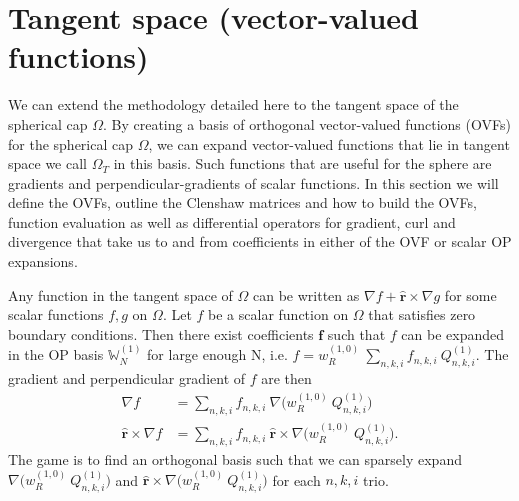 \documentclass[11pt, oneside]{article}   	%
\newcommand{\genjac}{R}
\newcommand{\genjacw}{w_\genjac}
\newcommand{\bigW}{\mathbb{W}}
\newcommand{\scop}{Q}
\newcommand{\scopnki}{\scop_{n,k,i}}
\newcommand{\tangentspace}{{\Omega_T}}
\newcommand{\rvec}{\hat{\bm{r}}}
\begin{document}


%
\section{Tangent space (vector-valued functions)}\label{Section:tangentspace}

We can extend the methodology detailed here to the tangent space of the spherical cap $\Omega$. By creating a basis of orthogonal vector-valued functions (OVFs) for the spherical cap $\Omega$, we can expand vector-valued functions that lie in tangent space we call $\tangentspace$ in this basis. Such functions that are useful for the sphere are gradients and perpendicular-gradients of scalar functions. In this section we will define the OVFs, outline the Clenshaw matrices and how to build the OVFs, function evaluation as well as differential operators for gradient, curl and divergence that take us to and from coefficients in either of the OVF or scalar OP expansions.

Any function in the tangent space of $\Omega$ can be written as $\nabla f + \rvec \times \nabla g$ for some scalar functions $f, g$ on $\Omega$. Let $f$ be a scalar function on $\Omega$ that satisfies zero boundary conditions. Then there exist coefficients $\bm{f}$ such that $f$ can be expanded in the OP basis $\bigW_N^{(1)}$ for large enough N, i.e. $f = \genjacw^{(1,0)} \: \sum_{n,k,i} f_{n,k,i} \: \scopnki^{(1)}$. The gradient and perpendicular gradient of $f$ are then
\begin{align*}
	\nabla f &= \sum_{n,k,i} f_{n,k,i} \: \nabla \Big( \genjacw^{(1,0)} \: \scopnki^{(1)} \Big) \\
	\rvec \times \nabla f &= \sum_{n,k,i} f_{n,k,i} \: \rvec \times \nabla \Big( \genjacw^{(1,0)} \: \scopnki^{(1)} \Big).
\end{align*}
The game is to find an orthogonal basis such that we can sparsely expand $\nabla \Big( \genjacw^{(1,0)} \: \scopnki^{(1)} \Big)$ and $\rvec \times \nabla \Big( \genjacw^{(1,0)} \: \scopnki^{(1)} \Big)$ for each $n,k,i$ trio.
\end{document}
